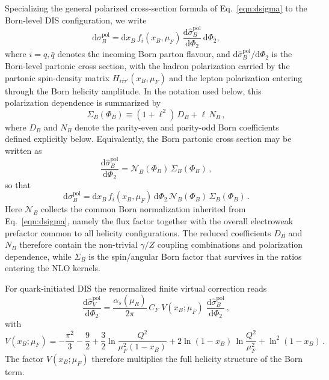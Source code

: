 \documentclass[a4paper,11pt]{article}
\begin{document}
Specializing the general polarized cross-section formula of Eq.~\eqref{eqn:dsigma} to the Born-level DIS configuration, we write
\begin{equation}
  \mathrm{d}\sigma_B^{\text{pol}}
  =
  \mathrm{d}x_B\, f_i(x_B,\mu_F)\,
  \frac{\mathrm{d}\hat\sigma_B^{\text{pol}}}{\mathrm{d}\Phi_2}\,
  \mathrm{d}\Phi_2 ,
\end{equation}
where $i=q,\bar q$ denotes the incoming Born parton flavour, and $\mathrm{d}\hat\sigma_B^{\text{pol}}/\mathrm{d}\Phi_2$ is the Born-level partonic cross section, with the hadron polarization carried by the partonic spin-density matrix $H_{i\tau\tau'}(x_B,\mu_F)$ and the lepton polarization entering through the Born helicity amplitude. In the notation used below, this polarization dependence is summarized by
\begin{equation}
  \Sigma_B(\Phi_B)\equiv (1+\ell^2)\,D_B+\ell\,N_B\,,
\label{eq:born-decomp}
\end{equation}
where $D_B$ and $N_B$ denote the parity-even and parity-odd Born coefficients defined explicitly below. Equivalently, the Born partonic cross section may be written as
\begin{equation}
  \frac{\mathrm{d}\hat\sigma_B^{\text{pol}}}{\mathrm{d}\Phi_2}
  =
  \mathcal{N}_B(\Phi_B)\,\Sigma_B(\Phi_B)\,,
\end{equation}
so that
\begin{equation}
  \mathrm{d}\sigma_B^{\text{pol}}
  =
  \mathrm{d}x_B\, f_i(x_B,\mu_F)\,\mathrm{d}\Phi_2\,
  \mathcal{N}_B(\Phi_B)\,\Sigma_B(\Phi_B)\,.
\end{equation}
Here $\mathcal{N}_B$ collects the common Born normalization inherited from Eq.~\eqref{eqn:dsigma}, namely the flux factor together with the overall electroweak prefactor common to all helicity configurations. The reduced coefficients $D_B$ and $N_B$ therefore contain the non-trivial $\gamma/Z$ coupling combinations and polarization dependence, while $\Sigma_B$ is the spin/angular Born factor that survives in the ratios entering the NLO kernels.

For quark-initiated DIS the renormalized finite virtual correction reads
\begin{equation}
\frac{\mathrm{d}\hat\sigma_V^{\text{pol}}}{\mathrm{d}\Phi_2}
=
\frac{\alpha_s(\mu_R)}{2\pi}\,C_F\;
V(x_B;\mu_F)\;
\frac{\mathrm{d}\hat\sigma_B^{\text{pol}}}{\mathrm{d}\Phi_2}\,,
\label{eq:virt-pol}
\end{equation}
with
\begin{equation}
V(x_B;\mu_F)=
-\frac{\pi^2}{3}-\frac{9}{2}
+\frac{3}{2}\ln\!\frac{Q^2}{\mu_F^2(1-x_B)}
+2\ln(1-x_B)\,\ln\!\frac{Q^2}{\mu_F^2}
+\ln^2(1-x_B)\,.
\label{eq:VxB}
\end{equation}
The factor $V(x_B;\mu_F)$ therefore multiplies the full helicity structure of the Born term.
\end{document}
